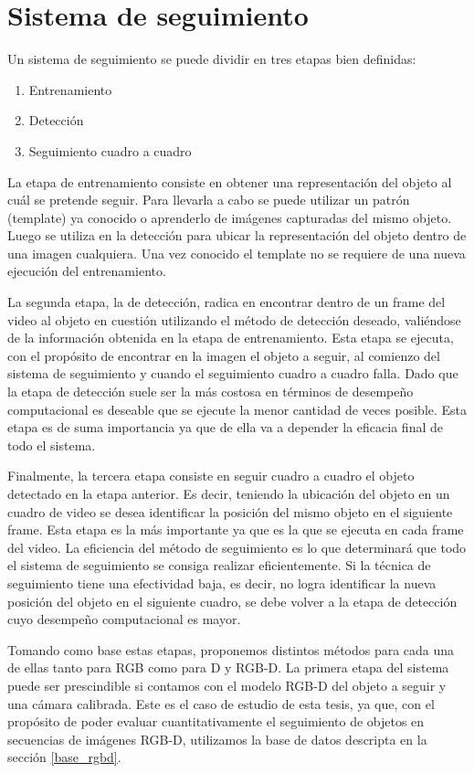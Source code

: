 \chapter{Sistema de seguimiento}

Un sistema de seguimiento se puede dividir en tres etapas bien definidas:
\begin{enumerate}
 \item Entrenamiento
 \item Detección
 \item Seguimiento cuadro a cuadro
\end{enumerate}

La etapa de entrenamiento consiste en obtener una representación del objeto al cuál se pretende seguir. Para llevarla a cabo se puede utilizar un patrón (template) ya conocido o aprenderlo de imágenes capturadas del mismo objeto. Luego se utiliza en la detección para ubicar la representación del objeto dentro de una imagen cualquiera. Una vez conocido el template no se requiere de una nueva ejecución del entrenamiento.

La segunda etapa, la de detección, radica en encontrar dentro de un frame del video al objeto en cuestión utilizando el método de detección deseado, valiéndose de la información obtenida en la etapa de entrenamiento. Esta etapa se ejecuta, con el propósito de encontrar en la imagen el objeto a seguir, al comienzo del sistema de seguimiento y cuando el seguimiento cuadro a cuadro falla. Dado que la etapa de detección suele ser la más costosa en términos de desempeño computacional es deseable que se ejecute la menor cantidad de veces posible. Esta etapa es de suma importancia ya que de ella va a depender la eficacia final de todo el sistema.

Finalmente, la tercera etapa consiste en seguir cuadro a cuadro el objeto detectado en la etapa anterior. Es decir, teniendo la ubicación del objeto en un cuadro de video se desea identificar la posición del mismo objeto en el siguiente frame. Esta etapa es la más importante ya que es la que se ejecuta en cada frame del video. La eficiencia del método de seguimiento es lo que determinará que todo el sistema de seguimiento se consiga realizar eficientemente. Si la técnica de seguimiento tiene una efectividad baja, es decir, no logra identificar la nueva posición del objeto en el siguiente cuadro, se debe volver a la etapa de detección cuyo desempeño computacional es mayor.

Tomando como base estas etapas, proponemos distintos métodos para cada una de ellas tanto para RGB como para D y RGB-D. La primera etapa del sistema puede ser prescindible si contamos con el modelo RGB-D del objeto a seguir y una cámara calibrada. Este es el caso de estudio de esta tesis, ya que, con el propósito de poder evaluar cuantitativamente el seguimiento de objetos en secuencias de imágenes RGB-D, utilizamos la base de datos descripta en la sección \ref{base_rgbd}.

